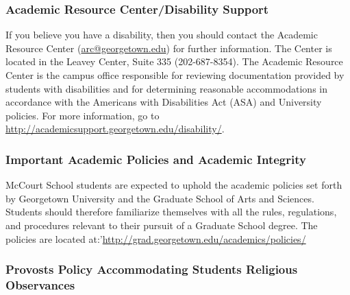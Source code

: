 \documentclass[
  12pt,
]{article}
\begin{document}
\hypertarget{academic-resource-centerdisability-support}{%
\subsubsection{Academic Resource Center/Disability
Support}\label{academic-resource-centerdisability-support}}

If you believe you have a disability, then you should contact the
Academic Resource Center (\url{arc@georgetown.edu}) for further
information. The Center is located in the Leavey Center, Suite 335
(202-687-8354). The Academic Resource Center is the campus office
responsible for reviewing documentation provided by students with
disabilities and for determining reasonable accommodations in accordance
with the Americans with Disabilities Act (ASA) and University policies.
For more information, go to
\url{http://academicsupport.georgetown.edu/disability/}.

\hypertarget{important-academic-policies-and-academic-integrity}{%
\subsubsection{Important Academic Policies and Academic
Integrity}\label{important-academic-policies-and-academic-integrity}}

McCourt School students are expected to uphold the academic policies set
forth by Georgetown University and the Graduate School of Arts and
Sciences. Students should therefore familiarize themselves with all the
rules, regulations, and procedures relevant to their pursuit of a
Graduate School degree. The policies are located
at:'\url{http://grad.georgetown.edu/academics/policies/}

\hypertarget{provosts-policy-accommodating-students-religious-observances}{%
\subsubsection{Provosts Policy Accommodating Students Religious
Observances}\label{provosts-policy-accommodating-students-religious-observances}}
\end{document}
